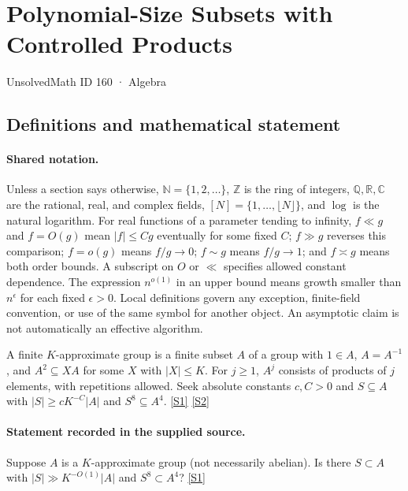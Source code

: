 \documentclass[11pt,a4paper]{article}
\newcommand{\N}{\mathbb{N}}
\newcommand{\Z}{\mathbb{Z}}
\newcommand{\Q}{\mathbb{Q}}
\newcommand{\R}{\mathbb{R}}
\newcommand{\C}{\mathbb{C}}
\newcommand{\sref}[2]{\hyperlink{source:#1:#2}{[S#2]}}
\begin{document}

\setcounter{section}{159}

\section{Polynomial-Size Subsets with Controlled Products}\label{160}

{\small\sffamily UnsolvedMath ID 160 · Algebra}

\subsection{Definitions and mathematical statement}

\paragraph{Shared notation.}Unless a section says otherwise, $\N=\{1,2,\ldots\}$,
$\Z$ is the ring of integers, $\Q,\R,\C$ are the rational, real, and complex
fields, $[N]=\{1,\ldots,\lfloor N\rfloor\}$, and $\log$ is the natural
logarithm. For real functions of a parameter tending to infinity,
$f\ll g$ and $f=O(g)$ mean $|f|\leq Cg$ eventually for some fixed $C$;
$f\gg g$ reverses this comparison; $f=o(g)$ means $f/g\to0$;
$f\sim g$ means $f/g\to1$; and $f\asymp g$ means both order bounds.
A subscript on $O$ or $\ll$ specifies allowed constant dependence.
The expression $n^{o(1)}$ in an upper bound means growth smaller than
$n^\epsilon$ for each fixed $\epsilon>0$. Local definitions govern any
exception, finite-field convention, or use of the same symbol for another
object. An asymptotic claim is not automatically an effective algorithm.



A finite $K$-approximate group is a finite subset $A$ of a group with $1\in A$, $A=A^{-1}$, and $A^2\subseteq XA$ for some $X$ with $|X|\leq K$. For $j\geq1$, $A^j$ consists of products of $j$ elements, with repetitions allowed. Seek absolute constants $c,C>0$ and $S\subseteq A$ with $|S|\geq cK^{-C}|A|$ and $S^8\subseteq A^4$. \sref{160}{1} \sref{160}{2}

\paragraph{Statement recorded in the supplied source.}
Suppose $A$ is a $K$-approximate group (not necessarily abelian). Is there $S \subset A$ with $|S| \gg K^{-O(1)}|A|$ and $S^8 \subset A^4$? \sref{160}{1}
\end{document}
